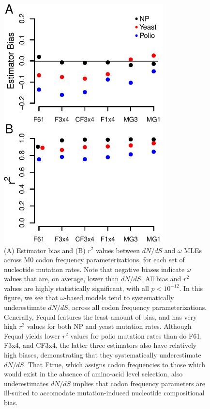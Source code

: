 \documentclass{pnastwo}
\newcommand{\xline}[0]{\noindent\underline{\makebox[0.15cm][l]{}}}
\begin{document}
\begin{figure}[htbp]
	\centerline{\includegraphics[width=8.7cm]{figures/MainText/nyp_bias_r2.pdf}}
	\caption{\label{nyp_bias_r2} (A) Estimator bias and (B) $r^2$ values between $dN/dS$ and $\omega$ MLEs across M0 codon frequency parameterizations, for each set of nucleotide mutation rates. Note that negative biases indicate $\omega$ values that are, on average, lower than $dN/dS$. All bias and $r^2$ values are highly statistically significant, with all $p < 10^{-12}$. In this figure, we see that $\omega$-based models tend to systematically underestimate $dN/dS$, across all codon frequency parameterizations. Generally, F\protect\xline equal features the least amount of bias, and has very high $r^2$ values for both NP and yeast mutation rates. Although Fequal yields lower $r^2$ values for polio mutation rates than do F61, F3x4, and CF3x4, the latter three estimators also have relatively high biases, demonstrating that they systematically underestimate $dN/dS$. That Ftrue, which assigns codon frequencies to those which would exist in the absence of amino-acid level selection, also underestimates $dN/dS$ implies that codon frequency parameters are ill-suited to accomodate mutation-induced nucleotide compositional bias.}	
\end{figure}

\vspace{2cm}
\end{document}

